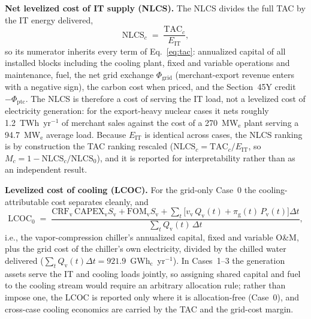 \documentclass[a4paper,fleqn]{cas-sc}
\newcommand{\runinhead}[1]{\par\smallskip\noindent\textbf{#1.}\quad}
\begin{document}
\runinhead{Net levelized cost of IT supply (NLCS)}
The NLCS divides the full TAC by the IT energy delivered,
\begin{equation}
\label{eq:nlcs}
\mathrm{NLCS}_c \;=\; \frac{\mathrm{TAC}_c}{E_\mathrm{IT}},
\end{equation}
so its numerator inherits every term of Eq.~\eqref{eq:tac}: annualized capital of all installed blocks including the cooling plant, fixed and variable operations and maintenance, fuel, the net grid exchange $\Phi_\mathrm{grid}$ (merchant-export revenue enters with a negative sign), the carbon cost when priced, and the Section~45Y credit $-\Phi_\mathrm{ptc}$. The NLCS is therefore a cost of serving the IT load, not a levelized cost of electricity generation: for the export-heavy nuclear cases it nets roughly 1.2~TWh~yr$^{-1}$ of merchant sales against the cost of a 270~MW$_\mathrm{e}$ plant serving a 94.7~MW$_\mathrm{e}$ average load. Because $E_\mathrm{IT}$ is identical across cases, the NLCS ranking is by construction the TAC ranking rescaled ($\mathrm{NLCS}_c = \mathrm{TAC}_c/E_\mathrm{IT}$, so $M_c = 1-\mathrm{NLCS}_c/\mathrm{NLCS}_0$), and it is reported for interpretability rather than as an independent result.

\runinhead{Levelized cost of cooling (LCOC)}
For the grid-only Case~0 the cooling-attributable cost separates cleanly, and
\begin{equation}
\label{eq:lcoc}
\mathrm{LCOC}_0 \;=\; \frac{\mathrm{CRF}_\mathrm{v}\,\mathrm{CAPEX}_\mathrm{v} S_\mathrm{v} + \mathrm{FOM}_\mathrm{v} S_\mathrm{v} + \sum_t \big[v_\mathrm{v}\, Q_\mathrm{v}(t) + \pi_\mathrm{g}(t)\, P_\mathrm{v}(t)\big]\Delta t}{\sum_t Q_\mathrm{v}(t)\,\Delta t},
\end{equation}
i.e., the vapor-compression chiller's annualized capital, fixed and variable O\&M, plus the grid cost of the chiller's own electricity, divided by the chilled water delivered ($\sum_t Q_\mathrm{v}(t)\Delta t = 921.9$~GWh$_\mathrm{c}$~yr$^{-1}$). In Cases~1--3 the generation assets serve the IT and cooling loads jointly, so assigning shared capital and fuel to the cooling stream would require an arbitrary allocation rule; rather than impose one, the LCOC is reported only where it is allocation-free (Case~0), and cross-case cooling economics are carried by the TAC and the grid-cost margin.
\end{document}
